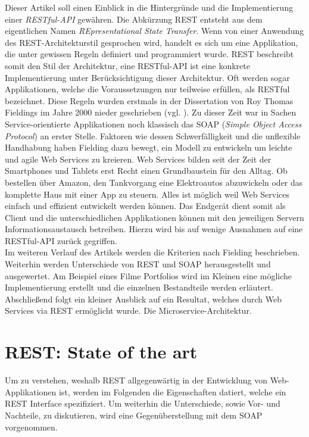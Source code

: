 \documentclass[fleqn,10.5pt,ngerman]{SelfArx}
\newlength{\tocsep}
\begin{document}
Dieser Artikel soll einen Einblick in die Hintergründe und die Implementierung einer \textit{RESTful-API} gewähren. Die Abkürzung REST entsteht aus dem eigentlichen Namen \textit{REpresentational State Transfer}. Wenn von einer Anwendung des REST-Architekturstil gesprochen wird, handelt es sich um eine Applikation, die unter gewissen Regeln definiert und programmiert wurde. REST beschreibt somit den Stil der Architektur, eine RESTful-API ist eine konkrete Implementierung unter Berücksichtigung dieser Architektur. Oft werden sogar Applikationen, welche die Voraussetzungen nur teilweise erfüllen, als RESTful bezeichnet. Diese Regeln wurden erstmals in der Dissertation von Roy Thomas Fieldings im Jahre 2000 nieder geschrieben (vgl. \cite{Fielding:2000}). Zu dieser Zeit war in Sachen Service-orientierte Applikationen noch klassisch das SOAP (\textit{Simple Object Access Protocol}) an erster Stelle. Faktoren wie dessen Schwerfälligkeit und die unflexible Handhabung haben Fielding dazu bewegt, ein Modell zu entwickeln um leichte und agile Web Services zu kreieren. Web Services bilden seit der Zeit der Smartphones und Tablets erst Recht einen Grundbaustein für den Alltag. Ob bestellen über Amazon, den Tankvorgang eine Elektroautos abzuwickeln oder das komplette Haus mit einer App zu steuern. Alles ist möglich weil Web Services einfach und effizient entwickelt werden können. Das Endgerät dient somit als Client und die unterschiedlichen Applikationen können mit den jeweiligen Servern Informationsaustausch betreiben. Hierzu wird bis auf wenige Ausnahmen auf eine RESTful-API zurück gegriffen. \\ Im weiteren Verlauf des Artikels werden die Kriterien nach Fielding beschrieben. Weiterhin werden Unterschiede von REST und SOAP herausgestellt und ausgewertet. Am Beispiel eines Filme Portfolios wird im Kleinen eine mögliche Implementierung erstellt und die einzelnen Bestandteile werden erläutert. Abschließend folgt ein kleiner Ausblick auf ein Resultat, welches durch Web Services via REST ermöglicht wurde. Die Microservice-Architektur.


\section{REST: State of the art}
Um zu verstehen, weshalb REST allgegenwärtig in der Entwicklung von Web-Applikationen ist, werden im Folgenden die Eigenschaften datiert, welche ein REST Interface spezifiziert. Um weiterhin die Unterschiede, sowie Vor- und Nachteile, zu diskutieren, wird eine Gegenüberstellung mit dem SOAP vorgenommen. 
\end{document}
